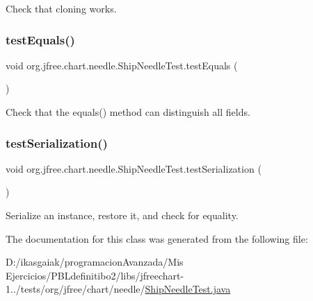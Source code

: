 Check that cloning works. \mbox{\label{classorg_1_1jfree_1_1chart_1_1needle_1_1_ship_needle_test_a7e0c433f564964b5f0995c8d73dfe2a0}} 
\subsubsection{\texorpdfstring{test\+Equals()}{testEquals()}}
{\footnotesize\ttfamily void org.\+jfree.\+chart.\+needle.\+Ship\+Needle\+Test.\+test\+Equals (\begin{DoxyParamCaption}{ }\end{DoxyParamCaption})}

Check that the equals() method can distinguish all fields. \mbox{\label{classorg_1_1jfree_1_1chart_1_1needle_1_1_ship_needle_test_a76acb5836e95e6b4ade541ee89f83a98}} 
\subsubsection{\texorpdfstring{test\+Serialization()}{testSerialization()}}
{\footnotesize\ttfamily void org.\+jfree.\+chart.\+needle.\+Ship\+Needle\+Test.\+test\+Serialization (\begin{DoxyParamCaption}{ }\end{DoxyParamCaption})}

Serialize an instance, restore it, and check for equality. 

The documentation for this class was generated from the following file\+:\begin{DoxyCompactItemize}
\item 
D\+:/ikasgaiak/programacion\+Avanzada/\+Mis Ejercicios/\+P\+B\+Ldefinitibo2/libs/jfreechart-\/1../tests/org/jfree/chart/needle/\mbox{\hyperlink{_ship_needle_test_8java}{Ship\+Needle\+Test.\+java}}\end{DoxyCompactItemize}

